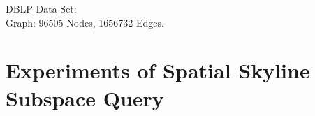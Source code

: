 DBLP Data Set:\\
Graph: 96505 Nodes, 1656732 Edges.\\
    


\section{Experiments of Spatial Skyline Subspace Query}


